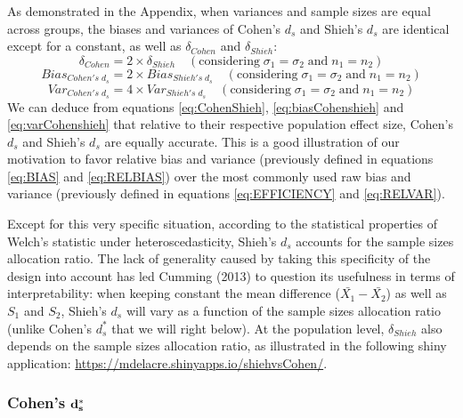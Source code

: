 \documentclass[
  english,
  man,floatsintext]{apa6}
\begin{document}
As demonstrated in the Appendix, when variances and sample sizes are equal across groups, the biases and variances of Cohen's \(d_s\) and Shieh's \(d_s\) are identical except for a constant, as well as \(\delta_{Cohen}\) and \(\delta_{Shieh}\):\\
\begin{equation} 
\delta_{Cohen} = 2 \times \delta_{Shieh} \quad (\mbox{considering} \; \sigma_1 = \sigma_2 \; \mbox{and} \; n_1 = n_2)
\label{eq:CohenShieh}
\end{equation}
\begin{equation} 
Bias_{Cohen's \; d{_s}} = 2 \times Bias_{Shieh's \; d{_s}} \quad (\mbox{considering} \; \sigma_1 = \sigma_2 \; \mbox{and} \; n_1 = n_2)
\label{eq:biasCohenshieh}
\end{equation}
\begin{equation} 
Var_{Cohen's \; d{_s}} = 4 \times Var_{Shieh's \; d{_s}} \quad (\mbox{considering}\; \sigma_1 = \sigma_2 \; \mbox{and} \; n_1 = n_2)
\label{eq:varCohenshieh}
\end{equation}
We can deduce from equations \ref{eq:CohenShieh}, \ref{eq:biasCohenshieh} and \ref{eq:varCohenshieh} that relative to their respective population effect size, Cohen's \(d_s\) and Shieh's \(d_s\) are equally accurate. This is a good illustration of our motivation to favor relative bias and variance (previously defined in equations \ref{eq:BIAS} and \ref{eq:RELBIAS}) over the most commonly used raw bias and variance (previously defined in equations \ref{eq:EFFICIENCY} and \ref{eq:RELVAR}).

Except for this very specific situation, according to the statistical properties of Welch's statistic under heteroscedasticity, Shieh's \(d_s\) accounts for the sample sizes allocation ratio. The lack of generality caused by taking this specificity of the design into account has led Cumming (2013) to question its usefulness in terms of interpretability: when keeping constant the mean difference (\(\bar{X_1}-\bar{X_2}\)) as well as \(S_1\) and \(S_2\), Shieh's \(d_s\) will vary as a function of the sample sizes allocation ratio (unlike Cohen's \(d^*_s\) that we will right below). At the population level, \(\delta_{Shieh}\) also depends on the sample sizes allocation ratio, as illustrated in the following shiny application: \url{https://mdelacre.shinyapps.io/shiehvsCohen/}.

\hypertarget{cohens-bf-d_s}{%
\subsubsection{\texorpdfstring{Cohen's \(\bf d^*_s\)}{Cohen's \textbackslash bf d\^{}*\_s}}\label{cohens-bf-d_s}}
\end{document}
